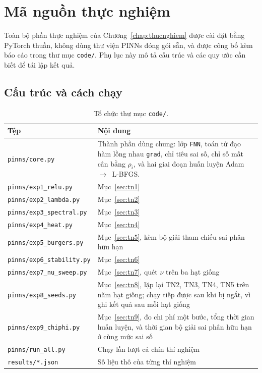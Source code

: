 \appendix

\chapter{Mã nguồn thực nghiệm}
\label{app:code}

Toàn bộ phần thực nghiệm của Chương~\ref{chap:thucnghiem} được cài đặt bằng
PyTorch thuần, không dùng thư viện PINNs đóng gói sẵn, và được công bố kèm báo
cáo trong thư mục \texttt{code/}. Phụ lục này mô tả cấu trúc và các quy ước cần
biết để tái lập kết quả.

\section{Cấu trúc và cách chạy}

\begin{table}[H]
\centering
\caption{Tổ chức thư mục \texttt{code/}.}
\label{tab:code-struct}
\small
\begin{tabular}{@{}l p{9.2cm}@{}}
\toprule
\textbf{Tệp} & \textbf{Nội dung} \\
\midrule
\texttt{pinns/core.py} & Thành phần dùng chung: lớp \texttt{FNN}, toán tử đạo
  hàm lồng nhau \texttt{grad}, chỉ tiêu sai số, chỉ số mất cân bằng
  $\rho_i$, và hai giai đoạn huấn luyện Adam~$\to$~L-BFGS. \\
\texttt{pinns/exp1\_relu.py} & Mục~\ref{sec:tn1} \\
\texttt{pinns/exp2\_lambda.py} & Mục~\ref{sec:tn2} \\
\texttt{pinns/exp3\_spectral.py} & Mục~\ref{sec:tn3} \\
\texttt{pinns/exp4\_heat.py} & Mục~\ref{sec:tn4} \\
\texttt{pinns/exp5\_burgers.py} & Mục~\ref{sec:tn5}, kèm bộ giải tham chiếu sai
  phân hữu hạn \\
\texttt{pinns/exp6\_stability.py} & Mục~\ref{sec:tn6} \\
\texttt{pinns/exp7\_nu\_sweep.py} & Mục~\ref{sec:tn7}, quét $\nu$ trên ba hạt
  giống \\
\texttt{pinns/exp8\_seeds.py} & Mục~\ref{sec:tn8}, lặp lại TN2, TN3, TN4, TN5
  trên năm hạt giống; chạy tiếp được sau khi bị ngắt, vì ghi kết quả sau mỗi hạt
  giống \\
\texttt{pinns/exp9\_chiphi.py} & Mục~\ref{sec:tn9}, đo chi phí một bước, tổng
  thời gian huấn luyện, và thời gian bộ giải sai phân hữu hạn ở cùng mức sai số \\
\texttt{pinns/run\_all.py} & Chạy lần lượt cả chín thí nghiệm \\
\texttt{results/*.json} & Số liệu thô của từng thí nghiệm \\
\bottomrule
\end{tabular}
\end{table}

